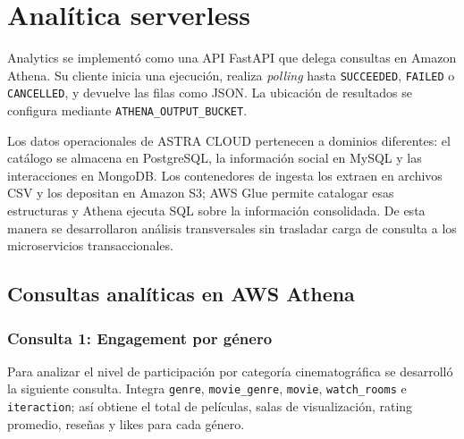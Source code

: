 \chapter{Analítica serverless}
Analytics se implementó como una API FastAPI que delega consultas en Amazon Athena. Su cliente inicia una ejecución, realiza \textit{polling} hasta \texttt{SUCCEEDED}, \texttt{FAILED} o \texttt{CANCELLED}, y devuelve las filas como JSON. La ubicación de resultados se configura mediante \texttt{ATHENA\_OUTPUT\_BUCKET}.

Los datos operacionales de ASTRA CLOUD pertenecen a dominios diferentes: el catálogo se almacena en PostgreSQL, la información social en MySQL y las interacciones en MongoDB. Los contenedores de ingesta los extraen en archivos CSV y los depositan en Amazon S3; AWS Glue permite catalogar esas estructuras y Athena ejecuta SQL sobre la información consolidada. De esta manera se desarrollaron análisis transversales sin trasladar carga de consulta a los microservicios transaccionales.

\section{Consultas analíticas en AWS Athena}

\subsection*{Consulta 1: Engagement por género}
Para analizar el nivel de participación por categoría cinematográfica se desarrolló la siguiente consulta. Integra \texttt{genre}, \texttt{movie\_genre}, \texttt{movie}, \texttt{watch\_rooms} e \texttt{iteraction}; así obtiene el total de películas, salas de visualización, rating promedio, reseñas y likes para cada género.

